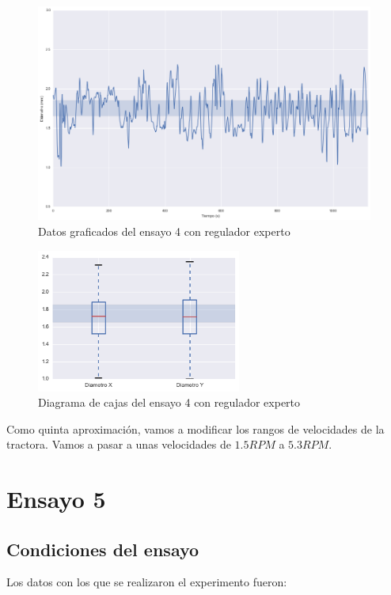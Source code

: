 \begin{figure}[H]
    \centering
    \includegraphics[width=0.99\textwidth]{images/producciones/13082015/output_9_e1.png}
    \caption{Datos graficados del ensayo 4 con regulador experto}
    \label{fig:reg_graf4}
\end{figure}

\begin{figure}[H]
    \centering
    \includegraphics[width=0.6\textwidth]{images/producciones/13082015/output_10_e1.png}
    \caption{Diagrama de cajas del ensayo 4 con regulador experto}
    \label{fig:reg_cajas4}
\end{figure}

Como quinta  aproximación, vamos a  modificar los rangos de velocidades de la tractora. Vamos a pasar a unas velocidades de $1.5RPM$ a $5.3RPM$.

\section{Ensayo 5}
\subsection{Condiciones del ensayo}
Los datos con los que se realizaron el experimento fueron:

